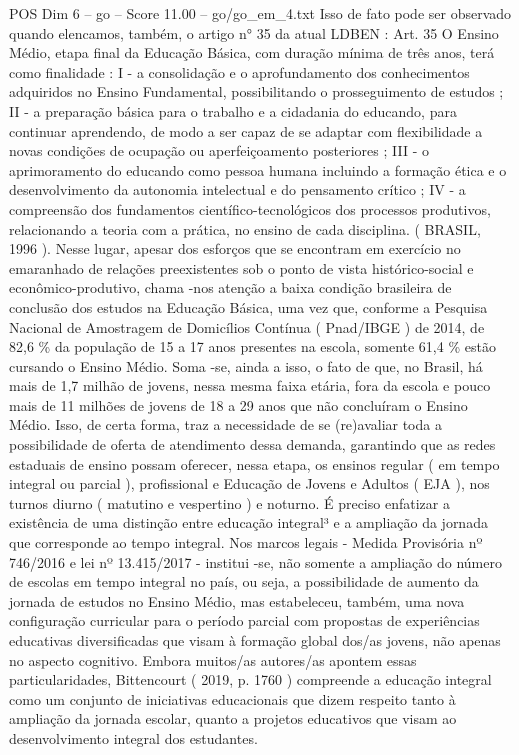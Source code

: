 \begin{textsample}{POS Dim 6 – go – Score 11.00 – go/go\_em\_4.txt}
Isso de fato pode ser observado quando elencamos, também, o artigo n{\EmojiFont °} 35 da atual LDBEN : Art. 35 O Ensino Médio, etapa final da Educação Básica, com duração mínima de três anos, terá como finalidade : I - a consolidação e o aprofundamento dos conhecimentos adquiridos no Ensino Fundamental, possibilitando o prosseguimento de estudos ; II - a preparação básica para o trabalho e a cidadania do educando, para continuar aprendendo, de modo a ser capaz de se adaptar com flexibilidade a novas condições de ocupação ou aperfeiçoamento posteriores ; III - o aprimoramento do educando como pessoa humana incluindo a formação ética e o desenvolvimento da autonomia intelectual e do pensamento crítico ; IV - a compreensão dos fundamentos científico-tecnológicos dos processos produtivos, relacionando a teoria com a prática, no ensino de cada disciplina. ( BRASIL, 1996 ).
Nesse lugar, apesar dos esforços que se encontram em exercício no emaranhado de relações preexistentes sob o ponto de vista histórico-social e econômico-produtivo, chama -nos atenção a baixa condição brasileira de conclusão dos estudos na Educação Básica, uma vez que, conforme a Pesquisa Nacional de Amostragem de Domicílios Contínua ( Pnad/IBGE ) de 2014, de 82,6 \% da população de 15 a 17 anos presentes na escola, somente 61,4 \% estão cursando o Ensino Médio.
Soma -se, ainda a isso, o fato de que, no Brasil, há mais de 1,7 milhão de jovens, nessa mesma faixa etária, fora da escola e pouco mais de 11 milhões de jovens de 18 a 29 anos que não concluíram o Ensino Médio.
Isso, de certa forma, traz a necessidade de se (re)avaliar toda a possibilidade de oferta de atendimento dessa demanda, garantindo que as redes estaduais de ensino possam oferecer, nessa etapa, os ensinos regular ( em tempo integral ou parcial ), profissional e Educação de Jovens e Adultos ( EJA ), nos turnos diurno ( matutino e vespertino ) e noturno.
É preciso enfatizar a existência de uma distinção entre educação integral³ e a ampliação da jornada que corresponde ao tempo integral.
Nos marcos legais - Medida Provisória nº 746/2016 e lei nº 13.415/2017 - institui -se, não somente a ampliação do número de escolas em tempo integral no país, ou seja, a possibilidade de aumento da jornada de estudos no Ensino Médio, mas estabeleceu, também, uma nova configuração curricular para o período parcial com propostas de experiências educativas diversificadas que visam à formação global dos/as jovens, não apenas no aspecto cognitivo.
Embora muitos/as autores/as apontem essas particularidades, Bittencourt ( 2019, p. 1760 ) compreende a educação integral como um conjunto de iniciativas educacionais que dizem respeito tanto à ampliação da jornada escolar, quanto a projetos educativos que visam ao desenvolvimento integral dos estudantes.

\end{textsample}
